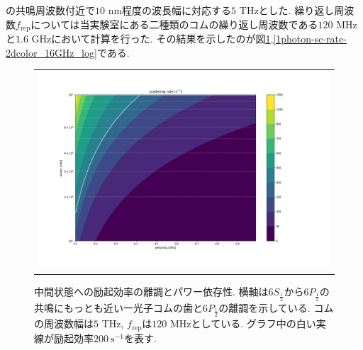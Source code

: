 \documentclass[uplatex, dvipdfmx, a4paper, report, papersize, 11pt]{jsbook}
\begin{document}
の共鳴周波数付近で$10$ nm程度の波長幅に対応する$5$ THzとした. 繰り返し周波数$f_{\mathrm{rep}}$については当実験室にある二種類のコムの繰り返し周波数である$120$ MHzと$1.6$ GHzにおいて計算を行った. その結果を示したのが図\ref{1photon-sc-rate-2dcolor_120MHz_log},\ref{1photon-sc-rate-2dcolor_16GHz_log}である. \\
\begin{figure}[H]
  \centering
    \begin{tabular}{c}
      \begin{minipage}{1\hsize}
        \centering
          \includegraphics[keepaspectratio,  scale=0.35,  angle=0]
                          {figures/chapter3/1photon-sc-rate-2dcolor_120MHz_log.png}
                          \caption{中間状態への励起効率の離調とパワー依存性. 横軸は$6S_{\frac{1}{2}}$から$6P_{\frac{1}{2}}$の共鳴にもっとも近い一光子コムの歯と$6P_{\frac{1}{2}}$の離調を示している. コムの周波数幅は$5$ THz, $f_{\mathrm{rep}}$は$120$ MHzとしている. グラフ中の白い実線が励起効率$200\ \mathrm{s^{-1}}$を表す. }
                          \label{1photon-sc-rate-2dcolor_120MHz_log}
      \end{minipage}\\
      \begin{minipage}{1\hsize}
        \centering
          \includegraphics[keepaspectratio,  scale=0.35,  angle=0]

\end{minipage}
\end{tabular}
\end{figure}
\end{document}
